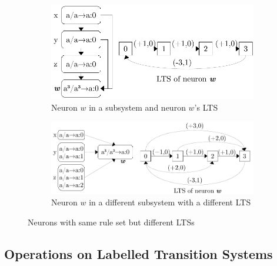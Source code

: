 \documentclass[runningheads,a4paper]{llncs}
\theoremstyle{definition}
\begin{document}
\begin{figure}[h]
   \centering
   \begin{subfigure}{\textwidth}
      \centering
      \includegraphics[scale=0.65]{fig-lts-2a.pdf}
      \caption{Neuron $w$ in a subsystem and neuron $w$'s LTS}
      \label{fig-lts-2a}
   \end{subfigure}
   \begin{subfigure}{\textwidth}
      \centering
      \includegraphics[scale=0.65]{fig-lts-2b.pdf}
      \caption{Neuron $w$ in a different subsystem with a different LTS}
      \label{fig-lts-2b}
   \end{subfigure}
   \caption{Neurons with same rule set but different LTSs}
   \label{fig-lts-2}
\end{figure}

\subsection{Operations on Labelled Transition Systems}
\end{document}
